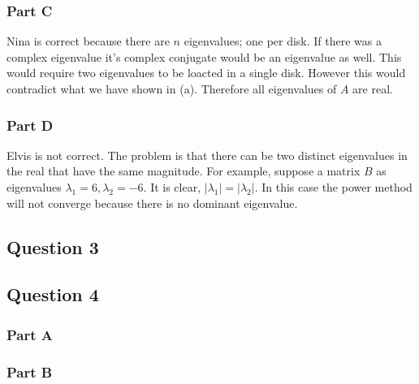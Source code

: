 \subsubsection{Part C}

Nina is correct because there are \(n\) eigenvalues; one per disk.
If there was a complex eigenvalue it's complex conjugate would be an eigenvalue as well.
This would require two eigenvalues to be loacted in a single disk.
However this would contradict what we have shown in (a).
Therefore all eigenvalues of \(A\) are real.

\subsubsection{Part D}

Elvis is not correct.
The problem is that there can be two distinct eigenvalues in the real that have the same magnitude.
For example, suppose a matrix \(B\) as eigenvalues \(\lambda_{1} = 6, \lambda_{2} = -6\).
It is clear, \(|\lambda_{1}| = |\lambda_{2}|\).
In this case the power method will not converge because there is no dominant eigenvalue.

\newpage
\subsection{Question 3}




\newpage
\subsection{Question 4}
\subsubsection{Part A}
\subsubsection{Part B}

%

